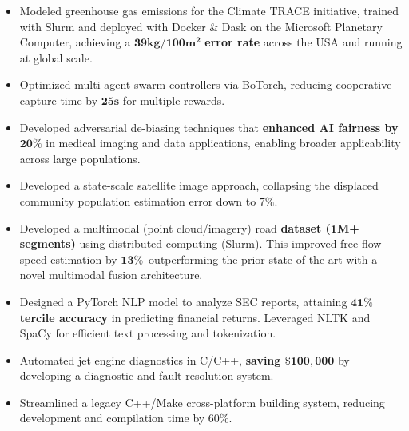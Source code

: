 \documentclass[11pt,a4paper,sans]{moderncv} %
\begin{document}

{
\begin{itemize} 
	\item Modeled greenhouse gas emissions for the Climate TRACE initiative, trained with Slurm and deployed with Docker \& Dask on the Microsoft Planetary Computer, achieving a $\mathbf{39kg/100m^2}$ \textbf{error rate} across the USA and running at global scale.
	\item Optimized multi-agent swarm controllers via BoTorch, reducing cooperative capture time by $\mathbf{25s}$ for multiple rewards.
	\item Developed adversarial de-biasing techniques that \textbf{enhanced AI fairness by $\mathbf{20\%}$} in medical imaging and data applications, enabling broader applicability across large populations.
	\item Developed a state-scale satellite image approach, collapsing the displaced community population estimation error down to $7\%$.
\end{itemize}
}


{
\begin{itemize}
	\item Developed a multimodal (point cloud/imagery) road \textbf{dataset ($\mathbf{1M}$+ segments)} using distributed computing (Slurm). This improved free-flow speed estimation by $\mathbf{13\%}$--outperforming the prior state-of-the-art with a novel multimodal fusion architecture.
	\item Designed a PyTorch NLP model to analyze SEC reports, attaining $\mathbf{41\%}$ \textbf{tercile accuracy} in predicting financial returns. Leveraged NLTK and SpaCy for efficient text processing and tokenization.
\end{itemize}
}


{
\begin{itemize}
	\item Automated jet engine diagnostics in C/C++, \textbf{saving $\mathbf{\$100,000}$} by developing a diagnostic and fault resolution system.
	\item Streamlined a legacy C++/Make cross-platform building system, reducing development and compilation time by $60\%$.
\end{itemize}
}
\end{document}
